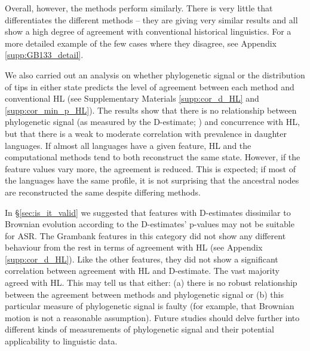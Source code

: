\documentclass[12pt,letterpaper]{article}
\begin{document}
Overall, however, the methods perform similarly. There is very little that differentiates the different methods -- they are giving very similar results and all show a high degree of agreement with conventional historical linguistics. For a more detailed example of the few cases where they disagree, see Appendix \ref{supp:GB133_detail}.

We also carried out an analysis on whether phylogenetic signal \citep{fritz2010selectivity} or the distribution of tips in either state predicts the level of agreement between each method and conventional HL (see Supplementary Materials \ref{supp:cor_d_HL} and \ref{supp:cor_min_p_HL}). The results show that there is no relationship between phylogenetic signal (as measured by the D-estimate; \citealt{fritz2010selectivity}) and concurrence with HL, but that there is a weak to moderate correlation with prevalence in daughter languages. If almost all languages have a given feature, HL and the computational methods tend to both reconstruct the same state. However, if the feature values vary more, the agreement is reduced. This is expected; if most of the languages have the same profile, it is not surprising that the ancestral nodes are reconstructed the same despite differing methods.

In §\ref{sec:is_it_valid} we suggested that features with D-estimates dissimilar to Brownian evolution according to the D-estimates' p-values may not be suitable for ASR. The Grambank features in this category did not show any different behaviour from the rest in terms of agreement with HL (see Appendix \ref{supp:cor_d_HL}). Like the other features, they did not show a significant correlation between agreement with HL and D-estimate. The vast majority agreed with HL. This may tell us that either: (a) there is no robust relationship between the agreement between methods and phylogenetic signal or (b) this particular measure of phylogenetic signal is faulty (for example, that Brownian motion is not a reasonable assumption). Future studies should delve further into different kinds of measurements of phylogenetic signal and their potential applicability to linguistic data.
\end{document}
